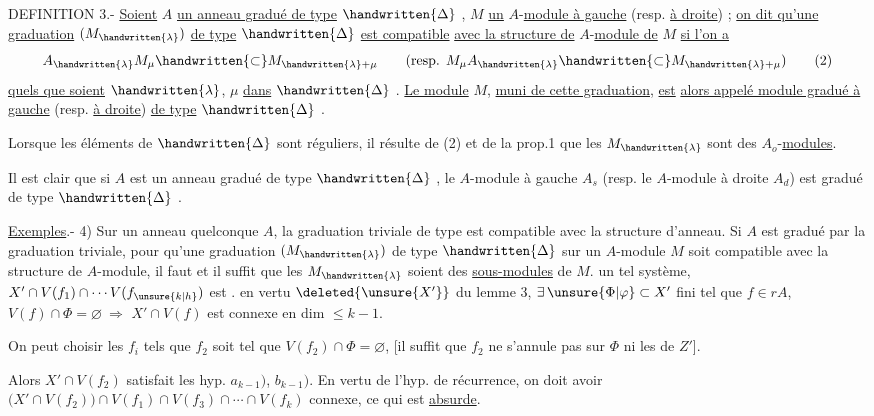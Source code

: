 DEFINITION 3.- \uline{Soient} $A$ \uline{un anneau gradué de type} $\handwritten{\Delta}$ , $M$ \uline{un} $A$-\uline{module à gauche}
(resp. \uline{à droite}) ; \uline{on dit qu'une graduation} $(M_{\handwritten{\lambda}})$ \uline{de type} $\handwritten{\Delta}$ \uline{est compatible}
\uline{avec la structure de} $A$-\uline{module de} $M$ \uline{si l'on a}
\begingroup
\makeatletter\tagsleft@true\makeatother
\[
 A_{\handwritten{\lambda}} M_\mu \handwritten{\subset} M_{\handwritten{\lambda}+\mu}
 \qquad (\text{resp. }M_\mu A_{\handwritten{\lambda}}\handwritten{\subset} M_{\handwritten{\lambda}+\mu})
 \tag*{(2)}
\]
\endgroup
\uline{quels que soient} $\handwritten{\lambda}$, $\mu$ \uline{dans} $\handwritten{\Delta}$ . \uline{Le module} $M$, \uline{muni de cette graduation}, \uline{est}
\uline{alors appelé module gradué à gauche} (resp. \uline{à droite}) \uline{de type} $\handwritten{\Delta}$ .

Lorsque les éléments de $\handwritten{\Delta}$ sont réguliers, il résulte de (2) et de la
prop.1 que les $M_{\handwritten{\lambda}}$ sont des $A_o$-\uline{modules}.

Il est clair que si $A$ est un anneau gradué de type $\handwritten{\Delta}$ , le $A$-module à gauche $A_s$ (resp. le $A$-module à droite $A_d$) est gradué de type $\handwritten{\Delta}$ .

\uline{Exemples}.- 4) Sur un anneau quelconque $A$, la graduation triviale de type
est compatible avec la structure d'anneau. Si $A$ est gradué par la graduation
triviale, pour qu'une graduation $(M_{\handwritten{\lambda}})$ de type $\handwritten{\Delta}$ sur un $A$-module $M$ soit compatible avec la structure de $A$-module, il faut et il suffit que les $M_{\handwritten{\lambda}}$
soient des \uline{sous-modules} de $M$.
un tel système, $X'\cap V(f_1)\cap\cdots V(f_{\unsure{k|h}})$
est \uline{}. \uline{}  en vertu
$\deleted{\unsure{X'}}$ du lemme 3, $\exists\,\unsure{\Phi|\varphi}\subset X'$ fini
tel que $f\in rA$, $V(f)\cap\Phi=\varnothing\ \Longrightarrow$
$X'\cap V(f)$ est connexe en dim $\leq k-1$.

On peut choisir les $f_i$ tels que
$f_2$ soit tel que $V(f_2)\cap\Phi=\varnothing$, 
[il suffit que $f_2$ ne s'annule pas
sur $\Phi$ ni les   de $Z'$].

Alors $X'\cap V(f_2)$ satisfait les
hyp. $a_{k-1})$, $b_{k-1})$. En vertu
de l'hyp. de récurrence, on
doit avoir $\bigl(X'\cap V(f_2)\bigr)\cap V(f_1)\cap V(f_3)\cap\cdots\cap V(f_k)$
connexe, ce qui est \uline{absurde}.

